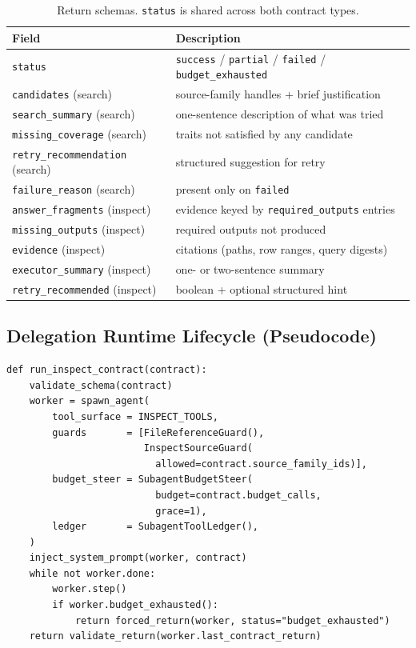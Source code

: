 \begin{table}[h]
\caption{Return schemas. \texttt{status} is shared across both contract types.}
\label{tab:return-schema}
\centering
\begin{tabular}{lp{}}
\toprule
Field & Description \\
\midrule
\texttt{status} & \texttt{success} / \texttt{partial} / \texttt{failed} / \texttt{budget\_exhausted} \\
\texttt{candidates} (search) & source-family handles + brief justification \\
\texttt{search\_summary} (search) & one-sentence description of what was tried \\
\texttt{missing\_coverage} (search) & traits not satisfied by any candidate \\
\texttt{retry\_recommendation} (search) & structured suggestion for retry \\
\texttt{failure\_reason} (search) & present only on \texttt{failed} \\
\texttt{answer\_fragments} (inspect) & evidence keyed by \texttt{required\_outputs} entries \\
\texttt{missing\_outputs} (inspect) & required outputs not produced \\
\texttt{evidence} (inspect) & citations (paths, row ranges, query digests) \\
\texttt{executor\_summary} (inspect) & one- or two-sentence summary \\
\texttt{retry\_recommended} (inspect) & boolean + optional structured hint \\
\bottomrule
\end{tabular}
\end{table}

\subsection{Delegation Runtime Lifecycle (Pseudocode)}

\begin{verbatim}
def run_inspect_contract(contract):
    validate_schema(contract)
    worker = spawn_agent(
        tool_surface = INSPECT_TOOLS,
        guards       = [FileReferenceGuard(),
                        InspectSourceGuard(
                          allowed=contract.source_family_ids)],
        budget_steer = SubagentBudgetSteer(
                          budget=contract.budget_calls,
                          grace=1),
        ledger       = SubagentToolLedger(),
    )
    inject_system_prompt(worker, contract)
    while not worker.done:
        worker.step()
        if worker.budget_exhausted():
            return forced_return(worker, status="budget_exhausted")
    return validate_return(worker.last_contract_return)
\end{verbatim}

